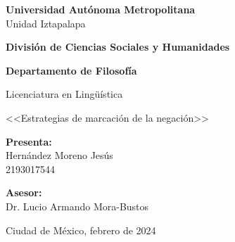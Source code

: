 \begin{titlepage}
\begin{center}

{\LARGE \textbf{Universidad Autónoma Metropolitana}} \\
{\Large Unidad Iztapalapa} \vspace{3cm}

{\Large \textbf{División de Ciencias Sociales y Humanidades}} \vspace{2cm}

{\large \textbf{Departamento de Filosofía}}

{\Large Licenciatura en Lingüística} \vspace{2cm}

{\Large <<Estrategias de marcación de la negación>>} \vspace{2cm}


{\Large \textbf{Presenta:}} \\
{\Large Hernández Moreno Jesús \\
2193017544} \vspace{2cm}

{\Large \textbf{Asesor:}} \\
{\Large Dr. Lucio Armando Mora-Bustos} \vfill
 
{\Large Ciudad de México, febrero de 2024}
\end{center}   
\end{titlepage}